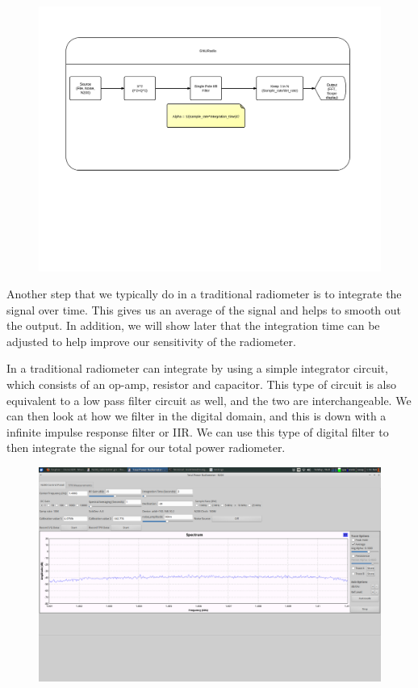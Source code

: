 {\begin{figure}[h!tb] 
\centering
\includegraphics[width=17cm]{Images/GNURadio_Block.png}
\label{square_block}
\end{figure}
}

Another step that we typically do in a traditional radiometer is to integrate the signal over time.  This gives us an average of the signal and helps to smooth out the output.  In addition, we will show later that the integration time can be adjusted to help improve our sensitivity of the radiometer.

In a traditional radiometer can integrate by using a simple integrator circuit, which consists of an op-amp, resistor and capacitor.  This type of circuit is also equivalent to a low pass filter circuit as well, and the two are interchangeable.  We can then look at how we filter in the digital domain, and this is down with a infinite impulse response filter or IIR.  We can use this type of digital filter to then integrate the signal for our total power radiometer. 

{\begin{figure}[h!tb] 
\centering
\includegraphics[width=17cm]{Images/radiometer_gui.png}
\label{radiometer_gui}
\end{figure}
}


